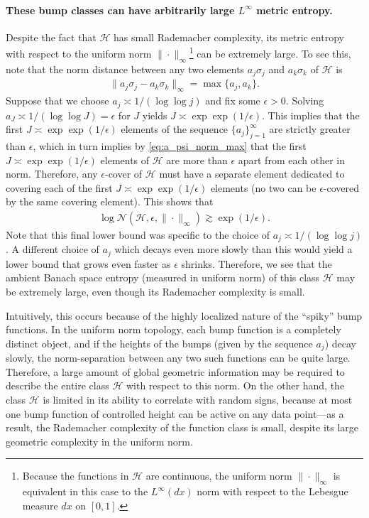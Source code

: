 \documentclass{article}
\def\cH{{\mathcal{H}}}
\def\cN{{\mathcal{N}}}
\begin{document}
\begin{appendices}
\paragraph{These bump classes can have arbitrarily large $L^\infty$ metric entropy.} Despite the fact that $\cH$ has small Rademacher complexity, its metric entropy with respect to the uniform norm $\| \cdot \|_\infty$\footnote{Because the functions in $\cH$ are continuous, the uniform norm $\| \cdot \|_\infty$ is equivalent in this case to the $L^\infty(dx)$ norm with respect to the Lebesgue measure $dx$ on $[0,1]$.} can be extremely large. To see this, note that the norm distance between any two elements $a_j \sigma_j$ and $a_k \sigma_k$ of $\cH$ is
\begin{align} \label{eq:a_psi_norm_max}
    \| a_j \sigma_j - a_k \sigma_k \|_{\infty} = \max \{ a_j, a_k \}.
\end{align}
Suppose that we choose $a_j \asymp 1/(\log \log j)$ and fix some $\epsilon > 0$. Solving $a_J \asymp 1/(\log \log J) = \epsilon$ for $J$  yields $J \asymp \exp \exp (1/\epsilon)$. This implies that the first $J \asymp \exp \exp (1/\epsilon)$ elements of the sequence $\{ a_j \}_{j=1}^\infty$ are strictly greater than $\epsilon$, which in turn implies by \eqref{eq:a_psi_norm_max} that the first $J \asymp \exp \exp (1/\epsilon)$ elements of $\cH$ are more than $\epsilon$ apart from each other in norm. Therefore, any $\epsilon$-cover of $\cH$ must have a separate element dedicated to covering each of the first $J \asymp \exp \exp (1/\epsilon)$ elements (no two can be $\epsilon$-covered by the same covering element). This shows that
\begin{align}
    \log \cN(\cH, \epsilon, \| \cdot \|_\infty) \gtrsim \exp (1/\epsilon).
\end{align}
Note that this final lower bound was specific to the choice of $a_j \asymp 1/(\log \log j)$. A different choice of $a_j$ which decays even more slowly than this would yield a lower bound that grows even faster as $\epsilon$ shrinks. Therefore, we see that the ambient Banach space entropy (measured in uniform norm) of this class $\cH$ may be extremely large, even though its Rademacher complexity is small.

Intuitively, this occurs because of the highly localized nature of the ``spiky'' bump functions. In the uniform norm topology, each bump function is a completely distinct object, and if the heights of the bumps (given by the sequence $a_j$) decay slowly, the norm-separation between any two such functions can be quite large. Therefore, a large amount of global geometric information may be required to describe the entire class $\cH$ with respect to this norm. On the other hand, the class $\cH$ is limited in its ability to correlate with random signs, because at most one bump function of controlled height can be active on any data point---as a result, the Rademacher complexity of the function class is small, despite its large geometric complexity in the uniform norm.


\end{appendices}
\end{document}
